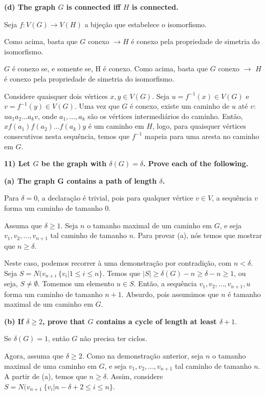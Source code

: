 \documentclass[]{article}
\begin{document}
\noindent \textbf{(d) The graph $G$ is connected iff $H$ is connected.}

Seja $f: V(G) \rightarrow V(H)$ a bijeção que estabelece o isomorfismo.

Como acima, basta que $G$ conexo $\rightarrow H$ é conexo pela propriedade de simetria do isomorfismo.

$G$ é conexo se, e somente se, H é conexo. Como acima, basta que $G$ conexo $\rightarrow$ $H$ é conexo pela propriedade de simetria do isomorfismo.

Considere quaisquer dois vértices $x, y \in V(G)$. Seja $u = f^{-1}(x) \in V(G)$ e $v = f^{-1}(y) \in V(G)$. Uma vez que $G$ é conexo, existe um caminho de $u$ até $v$: $ua_1a_2...a_kv$, onde $a_1, ..., a_k$ são os vértices intermediários do caminho. Então, $xf(a_1)f(a_2)...f(a_k)y$ é um caminho em $H$, logo, para quaisquer vértices consecutivos nesta sequência, temos que $f^{-1}$ mapeia para uma aresta no caminho em $G$.

\newpage

\noindent \textbf{11) Let $G$ be the graph with $\delta(G) = \delta$. Prove each of the following.}

\noindent \textbf{(a) The graph G contains a path of length $\delta$.}

Para $\delta=0$, a declaração é trivial, pois para qualquer vértice $v \in V$, a sequência $v$ forma um caminho de tamanho 0.

Assuma que $\delta \geq 1$. Seja $n$ o tamanho maximal de um caminho em $G$, e seja $v_1, v_2, ..., v_{n+1}$ tal caminho de tamanho $n$. Para provar (a), nós temos que mostrar que $n \geq \delta$.

Neste caso, podemos recorrer à uma demonstração por contradição, com $n < \delta$. Seja $S = N(v_{n+i} \ \{v_i | 1 \leq i \leq n\}$. Temos que $|S| \geq \delta(G)-n \geq \delta-n \geq 1$, ou seja, $S \neq \emptyset$. Tomemos um elemento $u \in S$. Então, a sequência $v_1, v_2, ..., v_{n+1}, u$ forma um caminho de tamanho $n+1$. Absurdo, pois assumimos que $n$ é tamanho maximal de um caminho em $G$.

\noindent \textbf{(b) If $\delta \geq 2$, prove that $G$ contains a cycle of length at least $\delta + 1$}.

Se $\delta(G)=1$, então $G$ não precisa ter ciclos.

Agora, assuma que $\delta \geq 2$. Como na demonstração anterior, seja $n$ o tamanho maximal de uma caminho em $G$, e seja $v_1, v_2, ..., v_{n+1}$ tal caminho de tamanho $n$. A partir de (a), temos que $n \geq \delta$. Assim, considere $S = N(v_{n+1} \ \{v_i | n-\delta+2 \leq i \leq n\}$.
\end{document}

